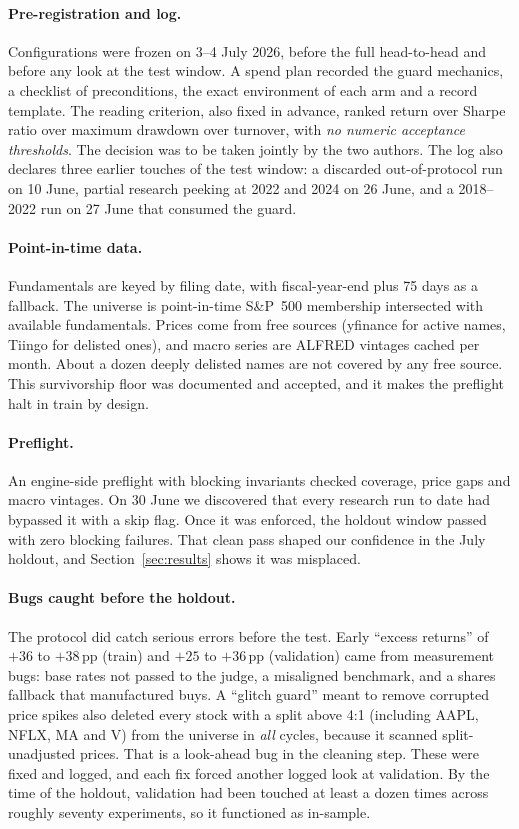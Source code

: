 \documentclass[11pt]{article}
\begin{document}
\paragraph{Pre-registration and log.} Configurations were frozen on 3--4 July 2026, before the full head-to-head and before any look at the test window. A spend plan recorded the guard mechanics, a checklist of preconditions, the exact environment of each arm and a record template. The reading criterion, also fixed in advance, ranked return over Sharpe ratio over maximum drawdown over turnover, with \emph{no numeric acceptance thresholds}. The decision was to be taken jointly by the two authors. The log also declares three earlier touches of the test window: a discarded out-of-protocol run on 10 June, partial research peeking at 2022 and 2024 on 26 June, and a 2018--2022 run on 27 June that consumed the guard.

\paragraph{Point-in-time data.} Fundamentals are keyed by filing date, with fiscal-year-end plus 75 days as a fallback. The universe is point-in-time S\&P~500 membership intersected with available fundamentals. Prices come from free sources (yfinance for active names, Tiingo for delisted ones), and macro series are ALFRED vintages cached per month. About a dozen deeply delisted names are not covered by any free source. This survivorship floor was documented and accepted, and it makes the preflight halt in train by design.

\paragraph{Preflight.} An engine-side preflight with blocking invariants checked coverage, price gaps and macro vintages. On 30 June we discovered that every research run to date had bypassed it with a skip flag. Once it was enforced, the holdout window passed with zero blocking failures. That clean pass shaped our confidence in the July holdout, and Section~\ref{sec:results} shows it was misplaced.

\paragraph{Bugs caught before the holdout.} The protocol did catch serious errors before the test. Early ``excess returns'' of $+36$ to $+38$\,pp (train) and $+25$ to $+36$\,pp (validation) came from measurement bugs: base rates not passed to the judge, a misaligned benchmark, and a shares fallback that manufactured buys. A ``glitch guard'' meant to remove corrupted price spikes also deleted every stock with a split above 4:1 (including AAPL, NFLX, MA and V) from the universe in \emph{all} cycles, because it scanned split-unadjusted prices. That is a look-ahead bug in the cleaning step. These were fixed and logged, and each fix forced another logged look at validation. By the time of the holdout, validation had been touched at least a dozen times across roughly seventy experiments, so it functioned as in-sample.
\end{document}
